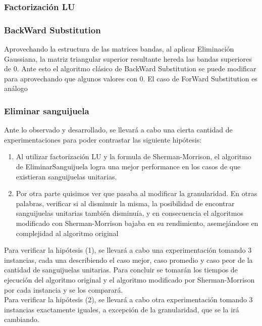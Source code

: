 	

















\subsubsection{Factorización LU}

\subsubsection{BackWard Substitution}
Aprovechando la estructura de las matrices bandas, al aplicar Eliminación Gaussiana, la matriz triangular superior resultante hereda las bandas superiores de 0. Ante esto el algoritmo clásico de BackWard Substitution se puede modificar para aprovechando que algunos valores con 0. El caso de ForWard Substitution es análogo


\subsubsection{Eliminar sanguijuela}
Ante lo observado y desarrollado, se llevará a cabo una cierta cantidad de experimentaciones para poder contrastar las siguiente  hipótesis:\\

\begin{enumerate}
\item Al utilizar factorización LU y la formula de Sherman-Morrison, el algoritmo de EliminarSanguijuela logra una mejor performance en los casos de que existieran sanguijuelas unitarias.
\item Por otra parte quisimos ver que pasaba al modificar la granularidad. En otras palabras, verificar si al disminuir la misma, la posibilidad de encontrar sanguijuelas unitarias también disminuía, y en consecuencia el algoritmos modificado con Sherman-Morrison bajaba en su rendimiento, asemejándose en complejidad al algoritmo original\\
\end{enumerate}


Para verificar la hipótesis (1), se llevará a cabo una experimentación tomando 3 instancias, cada una describiendo el caso mejor, caso promedio y caso peor de la cantidad de sanguijuelas unitarias. Para concluir se tomarán los tiempos de ejecución del algoritmo original y el algoritmo modificado por Sherman-Morrison por cada instancia y se los comparará.\\
Para verificar la hipótesis (2), se llevará a cabo otra experimentación tomando 3 instancias exactamente iguales, a excepción de la granularidad, que se la irá cambiando.
